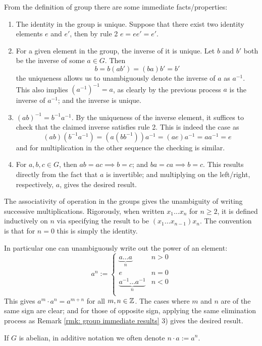 \begin{remark}\label{rmk: group immediate results}
    From the definition of group there are some immediate facts/properties:
    \begin{enumerate}[label=\arabic*)]
        \item The identity in the group is unique. Suppose that there exist two identity elements $e$ and $e'$, then by rule 2 $e = ee' = e'$.
        \item For a given element in the group, the inverse of it is unique. Let $b$ and $b'$ both be the inverse of some $a \in G$. Then
        \[
            b = b(ab') = (ba)b' = b'    
        \]
        the uniqueness allows us to unambiguously denote the inverse of $a$ as $a^{-1}$. This also implies $(a^{-1})^{-1} = a$, as clearly by the previous process $a$ is the inverse of $a^{-1}$; and the inverse is unique.
        \item $(ab)^{-1} = b^{-1} a^{-1}$. By the uniqueness of the inverse element, it suffices to check that the claimed inverse satisfies rule 2. This is indeed the case as
        \[
            (ab)(b^{-1}a^{-1}) = (a(bb^{-1}))a^{-1} = (ae)a^{-1} = aa^{-1} = e
        \]
        and for multiplication in the other sequence the checking is similar. 
        \item For $a, b, c \in G$, then $ab = ac \implies b = c$; and $ba = ca \implies b = c$. This results directly from the fact that $a$ is invertible; and multiplying on the left/right, respectively, $a$, gives the desired result.
    \end{enumerate}
\end{remark}

\begin{remark}\label{rmk: Z to group element}
    The associativity of operation in the groups gives the unambiguity of writing successive multiplications. Rigorously, when written $x_1\ldots x_n$ for $n \geq 2$, it is defined inductively on $n$ via specifying the result to be $(x_1\ldots x_{n-1})x_n$. The convention is that for $n = 0$ this is simply the identity.

    In particular one can unambiguously write out the power of an element:
    \[
        a^n := \begin{cases}
            \underbrace{a\ldots a}_{n}  & n > 0 \\
            e                           & n = 0 \\
            \underbrace{a^{-1}\ldots a^{-1}}_{n} & n < 0 \\
        \end{cases}
    \]
    This gives $a^m \cdot a^n = a^{m + n}$ for all $m, n \in \mathbb{Z}$. The cases where $m$ and $n$ are of the same sign are clear; and for those of opposite sign, applying the same elimination process as Remark \ref{rmk: group immediate results} 3) gives the desired result.

    If $G$ is abelian, in additive notation we often denote $n \cdot a := a^n$.
\end{remark}

